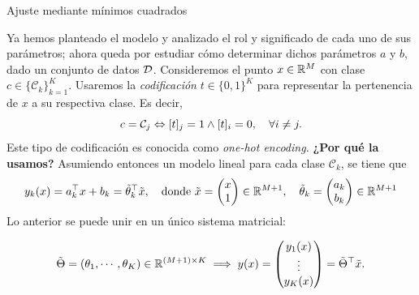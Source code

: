\documentclass[9pt]{beamer}
\begin{document}
\begin{frame}{Ajuste mediante mínimos cuadrados}

Ya hemos planteado el modelo y analizado el rol  y significado de cada uno de sus parámetros; ahora queda por estudiar cómo determinar dichos parámetros $a$ y $b$, dado un conjunto de datos ${\mathcal D}$.
\newline \pause 
Consideremos el  punto $x\in\mathbb{R}^M$ con clase $c\in\{\mathcal{C}_k\}_{k=1}^K$. Usaremos la \emph{codificación} $t \in\{0,1\}^K$ para representar la pertenencia de $x$ a su respectiva clase. Es decir, \pause
\begin{equation*}
  c = {\mathcal C}_j \Leftrightarrow [t]_j=1 \wedge [t]_i=0, \quad \forall i\neq j.
\end{equation*}
Este tipo de codificación  es conocida como \emph{one-hot  encoding.} \textbf{¿Por qué la usamos?} \pause \newline
Asumiendo entonces un modelo lineal para cada clase $\mathcal{C}_k$, se tiene que
\begin{equation*}
  y_k(x) = a_k^\top x + b_k = \tilde{\theta}_k^\top\tilde{x}, \quad \text{donde } \tilde{x} = \left( \begin{matrix} x\\ 1 \end{matrix}\right)\in\mathbb{R}^{M+1} ,\quad
  \tilde{\theta}_k = \left( \begin{matrix} a_k\\ b_k \end{matrix}\right)\in\mathbb{R}^{M+1}
\end{equation*}
\newline \pause
Lo anterior se puede unir en un único sistema matricial:

\begin{equation*}
\tilde{\Theta} = \left(\theta_1,\cdots,\theta_K\right)\in\mathbb{R}^{(M+1)\times K} \implies  y(x) = \left( \begin{matrix}y_1(x) \\\vdots \\ y_K(x) \end{matrix}\right) = \tilde{\Theta}^\top \tilde{x}.
  \end{equation*}




\end{frame}
\end{document}

